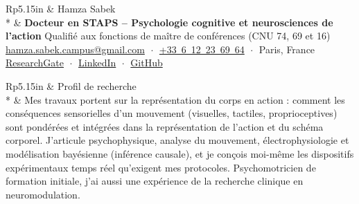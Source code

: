 \documentclass[a4paper, 11pt]{article}
\newcommand{\headingfont}{\Large\color{PineGreen}}
\newenvironment{SectionTable}[1]{
	\renewcommand*{\arraystretch}{1.1}
	\setlength{\tabcolsep}{8pt}
	\begin{longtable}{Rp{5.15in}} & #1 \\*}
{\end{longtable}\vspace{2pt}}
\begin{document}
\begin{SectionTable}{\Huge Hamza Sabek}
	& \textbf{Docteur en STAPS -- Psychologie cognitive et neurosciences de l'action}\newline
	Qualifié aux fonctions de maître de conférences (CNU 74, 69 et 16)\newline
	\href{mailto:hamza.sabek.campus@gmail.com}{hamza.sabek.campus@gmail.com} $\;\boldsymbol{\cdot}\;$
	\href{tel:+33612236964}{+33~6~12~23~69~64} $\;\boldsymbol{\cdot}\;$ Paris, France\newline
	\href{https://www.researchgate.net/profile/Hamza-Sabek}{ResearchGate} $\;\boldsymbol{\cdot}\;$
	\href{https://www.linkedin.com/in/hamza-sabek-19819470/}{LinkedIn} $\;\boldsymbol{\cdot}\;$
	\href{https://github.com/hamzasabek}{GitHub} \\
\end{SectionTable}

\begin{SectionTable}{\headingfont Profil de recherche}
	& Mes travaux portent sur la représentation du corps en action : comment les conséquences sensorielles d'un mouvement (visuelles, tactiles, proprioceptives) sont pondérées et intégrées dans la représentation de l'action et du schéma corporel. J'articule psychophysique, analyse du mouvement, électrophysiologie et modélisation bayésienne (inférence causale), et je conçois moi-même les dispositifs expérimentaux temps réel qu'exigent mes protocoles. Psychomotricien de formation initiale, j'ai aussi une expérience de la recherche clinique en neuromodulation. \\
\end{SectionTable}
\end{document}
